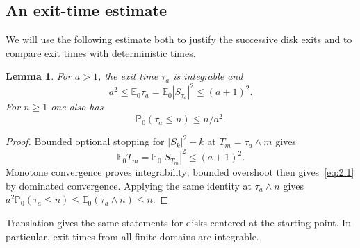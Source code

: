 \documentclass[11pt,a4paper]{article}
\numberwithin{equation}{section}
\newtheorem{lemma}[theorem]{Lemma}
\theoremstyle{remark}
\begin{document}
\subsection{An exit-time estimate}
We will use the following estimate both to justify the successive disk exits and to compare exit times with deterministic times.
\begin{lemma}\label{lem:exit}
For $a>1$, the exit time $\tau_a$ is integrable and
\begin{equation}\label{eq:2.1}
a^2\le\mathbb E_0\tau_a=\mathbb E_0|S_{\tau_a}|^2\le(a+1)^2.
\end{equation}
For $n\ge1$ one also has
\begin{equation}\label{eq:2.2}
\mathbb P_0(\tau_a\le n)\le n/a^2.
\end{equation}
\end{lemma}
\begin{proof}
Bounded optional stopping for $|S_k|^2-k$ at $T_m=\tau_a\wedge m$ gives
\begin{equation}\label{eq:2.3}
\mathbb E_0T_m=\mathbb E_0|S_{T_m}|^2\le(a+1)^2.
\end{equation}
Monotone convergence proves integrability; bounded overshoot then gives~\eqref{eq:2.1} by dominated convergence. Applying the same identity at $\tau_a\wedge n$ gives $a^2\mathbb P_0(\tau_a\le n)\le\mathbb E_0(\tau_a\wedge n)\le n$.
\end{proof}
Translation gives the same statements for disks centered at the starting point. In particular, exit times from all finite domains are integrable.
\end{document}
